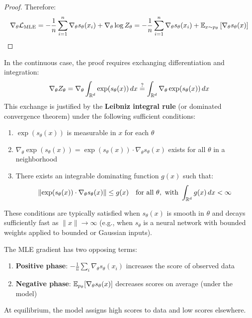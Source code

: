 \begin{notechapter}
\begin{proof}
Therefore:
\begin{equation}
\nabla_\theta \mathcal{L}_{\text{MLE}} = -\frac{1}{n}\sum_{i=1}^{n} \nabla_\theta s_\theta(x_i) + \nabla_\theta \log Z_\theta = -\frac{1}{n}\sum_{i=1}^{n} \nabla_\theta s_\theta(x_i) + \mathbb{E}_{x \sim p_\theta}\left[\nabla_\theta s_\theta(x)\right]
\end{equation}
\end{proof}

\begin{remark}
\label{contrastive-rigorous:rmk:regularity}
In the continuous case, the proof requires exchanging differentiation and integration:
\begin{equation}
\nabla_\theta Z_\theta = \nabla_\theta \int_{\mathbb{R}^d} \exp(s_\theta(x)) \, dx \stackrel{?}{=} \int_{\mathbb{R}^d} \nabla_\theta \exp(s_\theta(x)) \, dx
\end{equation}
This exchange is justified by the \textbf{Leibniz integral rule} (or dominated convergence theorem) under the following sufficient conditions:
\begin{enumerate}[label=(\roman*)]
    \item $\exp(s_\theta(x))$ is measurable in $x$ for each $\theta$
    \item $\nabla_\theta \exp(s_\theta(x)) = \exp(s_\theta(x)) \cdot \nabla_\theta s_\theta(x)$ exists for all $\theta$ in a neighborhood
    \item There exists an integrable dominating function $g(x)$ such that:
    \begin{equation}
    \left\| \exp(s_\theta(x)) \cdot \nabla_\theta s_\theta(x) \right\| \leq g(x) \quad \text{for all } \theta, \text{ with } \int_{\mathbb{R}^d} g(x) \, dx < \infty
    \end{equation}
\end{enumerate}
These conditions are typically satisfied when $s_\theta(x)$ is smooth in $\theta$ and decays sufficiently fast as $\|x\| \to \infty$ (e.g., when $s_\theta$ is a neural network with bounded weights applied to bounded or Gaussian inputs).
\end{remark}

\begin{intuition}
The MLE gradient has two opposing terms:
\begin{enumerate}
    \item \textbf{Positive phase}: $-\frac{1}{n}\sum_i \nabla_\theta s_\theta(x_i)$ increases the score of observed data
    \item \textbf{Negative phase}: $\mathbb{E}_{p_\theta}[\nabla_\theta s_\theta(x)]$ decreases scores on average (under the model)
\end{enumerate}
At equilibrium, the model assigns high scores to data and low scores elsewhere.
\end{intuition}


\end{notechapter}
